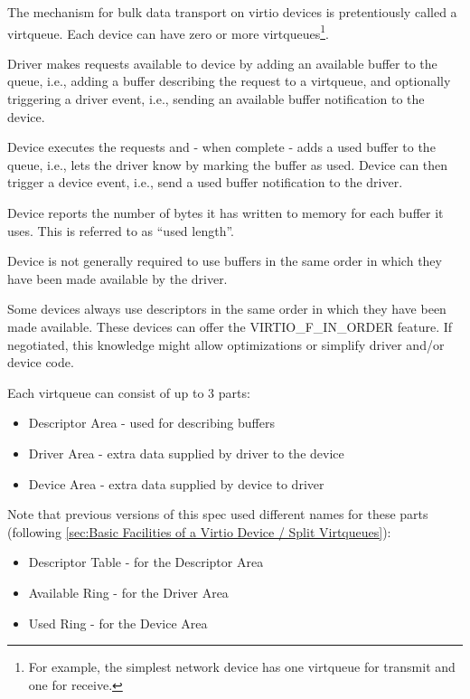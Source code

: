 The mechanism for bulk data transport on virtio devices is
pretentiously called a virtqueue. Each device can have zero or more
virtqueues\footnote{For example, the simplest network device has one virtqueue for
transmit and one for receive.}.

Driver makes requests available to device by adding
an available buffer to the queue, i.e., adding a buffer
describing the request to a virtqueue, and optionally triggering
a driver event, i.e., sending an available buffer notification
to the device.

Device executes the requests and - when complete - adds
a used buffer to the queue, i.e., lets the driver
know by marking the buffer as used. Device can then trigger
a device event, i.e., send a used buffer notification to the driver.

Device reports the number of bytes it has written to memory for
each buffer it uses. This is referred to as ``used length''.

Device is not generally required to use buffers in
the same order in which they have been made available
by the driver.

Some devices always use descriptors in the same order in which
they have been made available. These devices can offer the
VIRTIO_F_IN_ORDER feature. If negotiated, this knowledge
might allow optimizations or simplify driver and/or device code.

Each virtqueue can consist of up to 3 parts:
\begin{itemize}
\item Descriptor Area - used for describing buffers
\item Driver Area - extra data supplied by driver to the device
\item Device Area - extra data supplied by device to driver
\end{itemize}

\begin{note}
Note that previous versions of this spec used different names for
these parts (following \ref{sec:Basic Facilities of a Virtio Device / Split Virtqueues}):
\begin{itemize}
\item Descriptor Table - for the Descriptor Area
\item Available Ring - for the Driver Area
\item Used Ring - for the Device Area
\end{itemize}

\end{note}

